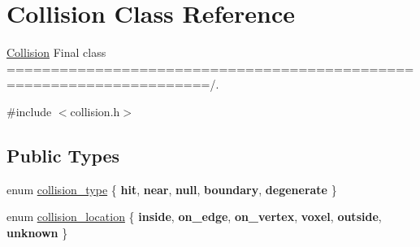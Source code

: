 \hypertarget{class_collision}{}\section{Collision Class Reference}
\label{class_collision}


\hyperlink{class_collision}{Collision} Final class =====================================================================/.  




{\ttfamily \#include $<$collision.\+h$>$}

\subsection*{Public Types}
\begin{DoxyCompactItemize}
\item 
enum \hyperlink{class_collision_aa7f309840b693689b164c7e4b4d643e5}{collision\+\_\+type} \{ \newline
{\bfseries hit}, 
{\bfseries near}, 
{\bfseries null}, 
{\bfseries boundary}, 
\newline
{\bfseries degenerate}
 \}
\item 
enum \hyperlink{class_collision_aad433eb4e51dbfd7ab9bbe188fbe47ab}{collision\+\_\+location} \{ \newline
{\bfseries inside}, 
{\bfseries on\+\_\+edge}, 
{\bfseries on\+\_\+vertex}, 
{\bfseries voxel}, 
\newline
{\bfseries outside}, 
{\bfseries unknown}
 \}
\end{DoxyCompactItemize}
